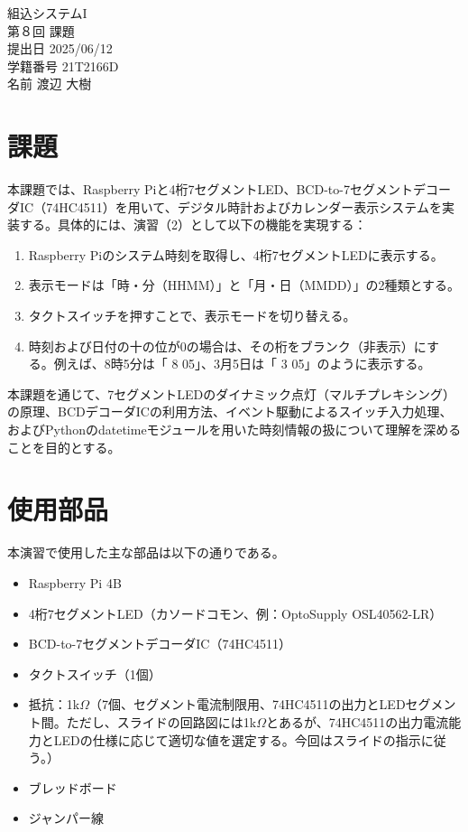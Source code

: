 \documentclass[a4paper,11pt,dvipdfmx]{jsarticle}
\begin{document}

\begin{titlepage}
\noindent
\vspace{4cm}
\begin{center}
\begin{LARGE}
組込システムI \\
第８回  課題 \\
\vspace{8cm}
提出日  2025/06/12 \\
学籍番号  21T2166D \\
名前  渡辺 大樹 \\
\end{LARGE}
\end{center}
\end{titlepage}
\setcounter{page}{1}

\section{課題}
本課題では、Raspberry Piと4桁7セグメントLED、BCD-to-7セグメントデコーダIC（74HC4511）を用いて、デジタル時計およびカレンダー表示システムを実装する。具体的には、演習（2）として以下の機能を実現する：
\begin{enumerate}
    \item Raspberry Piのシステム時刻を取得し、4桁7セグメントLEDに表示する。
    \item 表示モードは「時・分（HHMM）」と「月・日（MMDD）」の2種類とする。
    \item タクトスイッチを押すことで、表示モードを切り替える。
    \item 時刻および日付の十の位が0の場合は、その桁をブランク（非表示）にする。例えば、8時5分は「 8 05」、3月5日は「 3 05」のように表示する。
\end{enumerate}
本課題を通じて、7セグメントLEDのダイナミック点灯（マルチプレキシング）の原理、BCDデコーダICの利用方法、イベント駆動によるスイッチ入力処理、およびPythonのdatetimeモジュールを用いた時刻情報の扱について理解を深めることを目的とする。

\section{使用部品}
本演習で使用した主な部品は以下の通りである。
\begin{itemize}
    \item Raspberry Pi 4B
    \item 4桁7セグメントLED（カソードコモン、例：OptoSupply OSL40562-LR）
    \item BCD-to-7セグメントデコーダIC（74HC4511）
    \item タクトスイッチ（1個）
    \item 抵抗：1k$\Omega$（7個、セグメント電流制限用、74HC4511の出力とLEDセグメント間。ただし、スライドの回路図には1k$\Omega$とあるが、74HC4511の出力電流能力とLEDの仕様に応じて適切な値を選定する。今回はスライドの指示に従う。）
    \item ブレッドボード
    \item ジャンパー線
\end{itemize}
\end{document}
